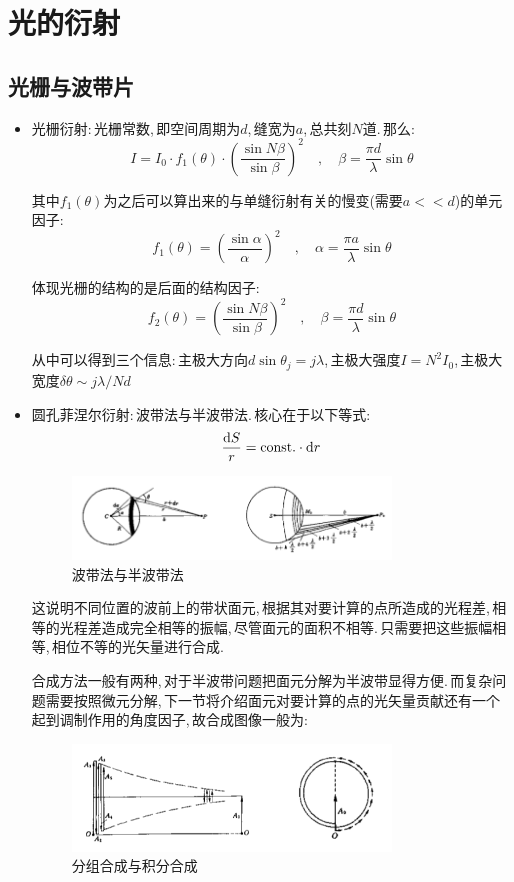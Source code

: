 \chapter{光的衍射}


\section{光栅与波带片}
\begin{itemize}
\item 光栅衍射:\,光栅常数,\,即空间周期为$d$,\,缝宽为$a$,\,总共刻$N$道.\,那么:
\[I=I_0\cdot f_1(\theta)\cdot \left(\frac{\sin N\beta}{\sin \beta}\right)^2\quad, \quad \beta=\frac{\pi d}{\lambda}\sin \theta\]

其中$f_1(\theta)$为之后可以算出来的与单缝衍射有关的慢变(需要$a<<d$)的单元因子:
\[f_1(\theta)=\left(\frac{\sin \alpha}{ \alpha}\right)^2\quad, \quad \alpha=\frac{\pi a}{\lambda}\sin \theta\]

体现光栅的结构的是后面的结构因子:
\[f_2(\theta)=\left(\frac{\sin N\beta}{\sin \beta}\right)^2\quad, \quad \beta=\frac{\pi d}{\lambda}\sin \theta\]

从中可以得到三个信息:\,主极大方向$d\sin\theta_j=j\lambda$,\,主极大强度$I=N^2 I_0$,\,主极大宽度$\delta\theta\sim j\lambda/Nd$

\item 圆孔菲涅尔衍射:\,波带法与半波带法.\,核心在于以下等式:
\[\frac{\textrm{d} S}{r}={\rm const.}\cdot \textrm{d} r\]

\begin{figure}[H]
\centering
\includegraphics[width=0.8\textwidth]{image/14-2-2.png}
\caption{波带法与半波带法}
\end{figure}

这说明不同位置的波前上的带状面元,\,根据其对要计算的点所造成的光程差,\,相等的光程差造成完全相等的振幅,\,尽管面元的面积不相等.\,只需要把这些振幅相等,\,相位不等的光矢量进行合成.

合成方法一般有两种,\,对于半波带问题把面元分解为半波带显得方便.\,而复杂问题需要按照微元分解,\,下一节将介绍面元对要计算的点的光矢量贡献还有一个起到调制作用的角度因子,\,故合成图像一般为:
\begin{figure}[H]
\centering
\includegraphics[width=0.8\textwidth]{image/14-2-3.png}
\caption{分组合成与积分合成}
\end{figure}


\end{itemize}
